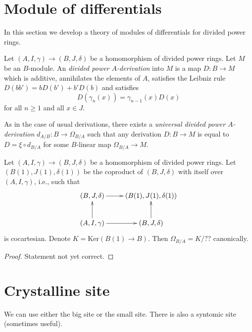\section{Module of differentials}
\label{section-differentials}

\noindent
In this section we develop a theory of modules of differentials
for divided power rings.

\begin{definition}
\label{definition-derivation}
Let $(A, I, \gamma) \to (B, J, \delta)$ be a homomorphism
of divided power rings. Let $M$ be an $B$-module.
An {\it divided power $A$-derivation} into $M$ is a map $D : B \to M$ which is
additive, annihilates the elements of $A$, satisfies the
Leibniz rule $D(bb') = bD(b') + b'D(b)$ and satisfies
$$
D(\gamma_n(x)) = \gamma_{n - 1}(x)D(x)
$$
for all $n \geq 1$ and all $x \in J$.
\end{definition}

\noindent
As in the case of usual derivations, there exists a
{\it universal divided power $A$-derivation} $d_{A/B} : B \to \Omega_{B/A}$
such that any derivation $D : B \to M$ is equal to
$D = \xi \circ d_{B/A}$ for some $B$-linear map $\Omega_{B/A} \to M$.

\begin{lemma}
\label{lemma-diagonal-and-differentials}
Let $(A, I, \gamma) \to (B, J, \delta)$ be a homomorphism
of divided power rings. Let $(B(1), J(1), \delta(1))$ be the coproduct
of $(B, J, \delta)$ with itself over $(A, I, \gamma)$, i.e.,
such that
$$
\xymatrix{
(B, J, \delta) \ar[r] & (B(1), J(1), \delta(1)) \\
(A, I, \gamma) \ar[r] \ar[u] & (B, J, \delta) \ar[u]
}
$$
is cocartesian. Denote $K = \text{Ker}(B(1) \to B)$.
Then $\Omega_{B/A} = K/??$ canonically.
\end{lemma}

\begin{proof}
Statement not yet correct.
\end{proof}






\section{Crystalline site}
\label{section-site}

\noindent
We can use either the big site or the small site.
There is also a syntomic site (sometimes useful).

